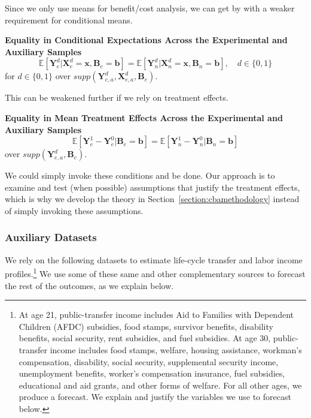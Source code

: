 \noindent  Since we only use means for benefit/cost analysis, we can get by with a weaker requirement for conditional means.

\onehalfspacing
\begin{condition} \textbf{Equality in Conditional Expectations Across the Experimental and Auxiliary Samples \label{cond:cond2}}
\begin{equation}
\mathbb{E} \left[ \bm{Y}_e^d |  \bm{X}_e^d = \bm{x}, \bm{B}_e = \bm{b} \right] = \mathbb{E} \left[ \bm{Y}_n^d |  \bm{X}_n^d = \bm{x}, \bm{B}_n = \bm{b} \right], \quad d \in \{0,1\}
\end{equation}
for $d \in \{0, 1 \}$ over $supp\left(\bm{Y}^d_{e,a}, \bm{X}^d_{e,a}, \bm{B}_e\right)$.
\end{condition}
\doublespacing

\noindent This can be weakened further if we rely on treatment effects.

\onehalfspacing
\begin{condition} \textbf{Equality in Mean Treatment Effects Across the Experimental and Auxiliary Samples \label{cond:cond3}}
\begin{equation}
\mathbb{E} \left[ \bm{Y}_e^1 - \bm{Y}_e^0 | \bm{B}_e = \bm{b} \right] = \mathbb{E} \left[ \bm{Y}_n^1 - \bm{Y}_n^0 | \bm{B}_n = \bm{b} \right]
\end{equation}
over $supp\left(\bm{Y}^d_{e,a}, \bm{B}_e\right)$.\footnotemark
\end{condition}
\doublespacing
We could simply invoke these conditions and be done. Our approach is to examine and test (when possible) assumptions that justify the treatment effects, which is why we develop the theory in Section~\ref{section:cbamethodology} instead of simply invoking these assumptions.

\subsubsection{Auxiliary Datasets} \label{app:datasets}

\noindent We rely on the following datasets to estimate life-cycle transfer and labor income profiles.\footnote{At age 21, public-transfer income includes Aid to Families with Dependent Children (AFDC) subsidies, food stamps, survivor benefits, disability benefits, social security, rent subsidies, and fuel subsidies. At age 30, public-transfer income includes food stamps, welfare, housing assistance, workman's compensation, disability, social security, supplemental security income, unemployment benefits, worker's compensation insurance, fuel subsidies, educational and aid grants, and other forms of welfare. For all other ages, we produce a forecast. We explain and justify the variables we use to forecast below.} We use some of these same and other complementary sources to forecast the rest of the outcomes, as we explain below.

